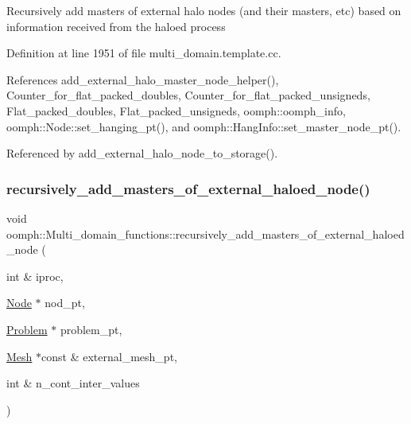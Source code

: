 Recursively add masters of external halo nodes (and their masters, etc) based on information received from the haloed process 

Definition at line 1951 of file multi\+\_\+domain.\+template.\+cc.



References add\+\_\+external\+\_\+halo\+\_\+master\+\_\+node\+\_\+helper(), Counter\+\_\+for\+\_\+flat\+\_\+packed\+\_\+doubles, Counter\+\_\+for\+\_\+flat\+\_\+packed\+\_\+unsigneds, Flat\+\_\+packed\+\_\+doubles, Flat\+\_\+packed\+\_\+unsigneds, oomph\+::oomph\+\_\+info, oomph\+::\+Node\+::set\+\_\+hanging\+\_\+pt(), and oomph\+::\+Hang\+Info\+::set\+\_\+master\+\_\+node\+\_\+pt().



Referenced by add\+\_\+external\+\_\+halo\+\_\+node\+\_\+to\+\_\+storage().

\mbox{\label{namespaceoomph_1_1Multi__domain__functions_abaafd14a3e78c1965c294797913b44bf}} 
\subsubsection{\texorpdfstring{recursively\+\_\+add\+\_\+masters\+\_\+of\+\_\+external\+\_\+haloed\+\_\+node()}{recursively\_add\_masters\_of\_external\_haloed\_node()}}
{\footnotesize\ttfamily void oomph\+::\+Multi\+\_\+domain\+\_\+functions\+::recursively\+\_\+add\+\_\+masters\+\_\+of\+\_\+external\+\_\+haloed\+\_\+node (\begin{DoxyParamCaption}\item[{int \&}]{iproc,  }\item[{\hyperlink{classoomph_1_1Node}{Node} $\ast$}]{nod\+\_\+pt,  }\item[{\hyperlink{classoomph_1_1Problem}{Problem} $\ast$}]{problem\+\_\+pt,  }\item[{\hyperlink{classoomph_1_1Mesh}{Mesh} $\ast$const \&}]{external\+\_\+mesh\+\_\+pt,  }\item[{int \&}]{n\+\_\+cont\+\_\+inter\+\_\+values }\end{DoxyParamCaption})}



